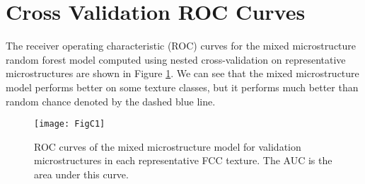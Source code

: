\documentclass[preprint,1p,times,authoryear]{elsarticle}%
\begin{document}
\clearpage
\section{Cross Validation ROC Curves} \label{CV_ROC} 
The receiver operating characteristic (ROC) curves for the mixed microstructure random forest model computed using nested cross-validation on representative microstructures are shown in Figure \ref{fig:CV_ROC}. We can see that the mixed microstructure model performs better on some texture classes, but it performs much better than random chance denoted by the dashed blue line.

\begin{figure}[!h]
\centering
\texttt{[image: FigC1]}%
\caption{ROC curves of the mixed microstructure model for validation microstructures in each representative FCC texture. The AUC is the area under this curve.}
\label{fig:CV_ROC}
\end{figure}
\end{document}
